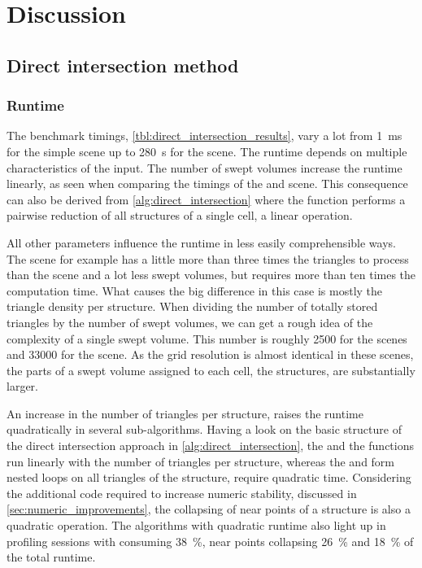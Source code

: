 
\chapter{Discussion}
\label{ch:discussion}


\section{Direct intersection method}
\label{sec:direct_intersection_discussion}


\subsection{Runtime}

The benchmark timings, \cf \cref{tbl:direct_intersection_results}, vary a lot from \SI{1}{\milli\second} for the simple \cubes scene up to \SI{280}{\second} for the \turbine scene.
The runtime depends on multiple characteristics of the input.
The number of swept volumes increase the runtime linearly, as seen when comparing the timings of the \impeller and \impellerhalf scene.
This consequence can also be derived from \cref{alg:direct_intersection} where the  function performs a pairwise reduction of all structures of a single cell, a linear operation.

All other parameters influence the runtime in less easily comprehensible ways.
The \turbine scene for example has a little more than three times the triangles to process than the \impeller scene and a lot less swept volumes, but requires more than ten times the computation time.
What causes the big difference in this case is mostly the triangle density per structure.
When dividing the number of totally stored triangles by the number of swept volumes, we can get a rough idea of the complexity of a single swept volume.
This number is roughly 2500 for the \impeller scenes and 33000 for the \turbine scene.
As the grid resolution is almost identical in these scenes, the parts of a swept volume assigned to each cell, \ie the structures, are substantially larger.

An increase in the number of triangles per structure, raises the runtime quadratically in several sub-algorithms.
Having a look on the basic structure of the direct intersection approach in \cref{alg:direct_intersection}, the  and the  functions run linearly with the number of triangles per structure, whereas the  and  form nested loops on all triangles of the structure, \ie require quadratic time.
Considering the additional code required to increase numeric stability, discussed in \cref{sec:numeric_improvements}, the collapsing of near points of a structure is also a quadratic operation.
The algorithms with quadratic runtime also light up in profiling sessions with  consuming \SI{38}{\percent}, near points collapsing \SI{26}{\percent} and  \SI{18}{\percent} of the total runtime.

